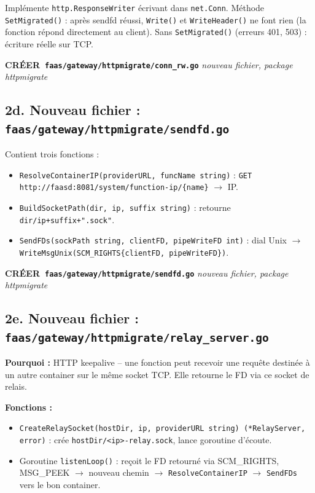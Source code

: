 \documentclass[11pt,a4paper]{article}
\newcommand{\act}[3]{%
  \vspace{0.2em}
  \noindent\colorbox{actionbg}{\parbox{\dimexpr\linewidth-2\fboxsep\relax}{%
    \small\textbf{#1~\texttt{#2}} \hfill \textit{\small #3}\\[-0.3em]
  }}
  \vspace{0.2em}
}
\begin{document}
Implémente \texttt{http.ResponseWriter} écrivant dans \texttt{net.Conn}.
Méthode \texttt{SetMigrated()} : après sendfd réussi, \texttt{Write()} et
\texttt{WriteHeader()} ne font rien (la fonction répond directement au client).
Sans \texttt{SetMigrated()} (erreurs 401, 503) : écriture réelle sur TCP.

\act{CRÉER}{faas/gateway/httpmigrate/conn\_rw.go}{nouveau fichier, package httpmigrate}

\subsection*{2d. Nouveau fichier : \texttt{faas/gateway/httpmigrate/sendfd.go}}

Contient trois fonctions :
\begin{itemize}[noitemsep]
  \item \texttt{ResolveContainerIP(providerURL, funcName string)} :
    \texttt{GET http://faasd:8081/system/function-ip/\{name\}} $\to$ IP.
  \item \texttt{BuildSocketPath(dir, ip, suffix string)} :
    retourne \texttt{dir/ip+suffix+".sock"}.
  \item \texttt{SendFDs(sockPath string, clientFD, pipeWriteFD int)} :
    dial Unix $\to$ \texttt{WriteMsgUnix(SCM\_RIGHTS\{clientFD, pipeWriteFD\})}.
\end{itemize}

\act{CRÉER}{faas/gateway/httpmigrate/sendfd.go}{nouveau fichier, package httpmigrate}

\subsection*{2e. Nouveau fichier : \texttt{faas/gateway/httpmigrate/relay\_server.go}}

\textbf{Pourquoi :} HTTP keepalive -- une fonction peut recevoir une requête destinée à un
autre container sur le même socket TCP. Elle retourne le FD via ce socket de relais.

\textbf{Fonctions :}
\begin{itemize}[noitemsep]
  \item \texttt{CreateRelaySocket(hostDir, ip, providerURL string) (*RelayServer, error)} :
    crée \texttt{hostDir/<ip>-relay.sock}, lance goroutine d'écoute.
  \item Goroutine \texttt{listenLoop()} : reçoit le FD retourné via SCM\_RIGHTS, MSG\_PEEK
    $\to$ nouveau chemin $\to$ \texttt{ResolveContainerIP} $\to$ \texttt{SendFDs} vers le
    bon container.
\end{itemize}
\end{document}
